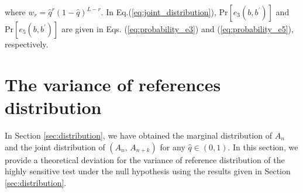 \documentclass[dvipdfmx,english]{ampmt} %
\begin{document}
where $w_r=\hat{q}^r(1-\hat{q})^{L-r}$. In Eq.(\ref{eq:joint_distribution}), $\mathrm{Pr} \left[e_3(b,b^\prime) \right]$ and $\mathrm{Pr} \left[e_5(b,b^\prime) \right]$ are given in Eqs. (\ref{eq:probability_e3}) and (\ref{eq:probability_e5}), respectively.
\newpage
\section{The variance of references distribution}\label{sec:3}
In Section \ref{sec:distribution}, we have obtained the marginal distribution of $A_n$ and the joint distribution of $(A_n,\,A_{n+k})$ for any $\hat{q}\in (0,1)$.
%
In this section, we provide a theoretical deviation for the variance of reference distribution of the highly sensitive test under the null hypothesis using the results given in Section \ref{sec:distribution}.
\end{document}
